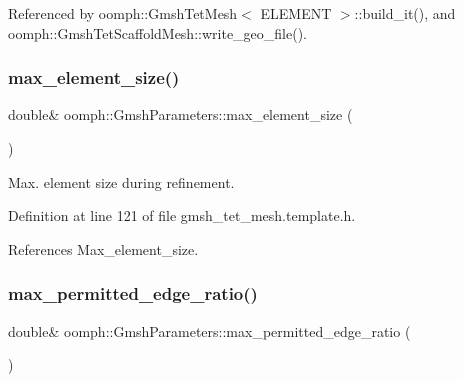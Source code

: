 Referenced by oomph\+::\+Gmsh\+Tet\+Mesh$<$ E\+L\+E\+M\+E\+N\+T $>$\+::build\+\_\+it(), and oomph\+::\+Gmsh\+Tet\+Scaffold\+Mesh\+::write\+\_\+geo\+\_\+file().

\mbox{\label{classoomph_1_1GmshParameters_afd08195fd9f804b7ced23728b6a63e15}} 
\subsubsection{\texorpdfstring{max\+\_\+element\+\_\+size()}{max\_element\_size()}}
{\footnotesize\ttfamily double\& oomph\+::\+Gmsh\+Parameters\+::max\+\_\+element\+\_\+size (\begin{DoxyParamCaption}{ }\end{DoxyParamCaption})\hspace{0.3cm}{\ttfamily [inline]}}



Max. element size during refinement. 



Definition at line 121 of file gmsh\+\_\+tet\+\_\+mesh.\+template.\+h.



References Max\+\_\+element\+\_\+size.

\mbox{\label{classoomph_1_1GmshParameters_afe2deda55a1eb76d4f782aab9a58089c}} 
\subsubsection{\texorpdfstring{max\+\_\+permitted\+\_\+edge\+\_\+ratio()}{max\_permitted\_edge\_ratio()}}
{\footnotesize\ttfamily double\& oomph\+::\+Gmsh\+Parameters\+::max\+\_\+permitted\+\_\+edge\+\_\+ratio (\begin{DoxyParamCaption}{ }\end{DoxyParamCaption})\hspace{0.3cm}{\ttfamily [inline]}}



